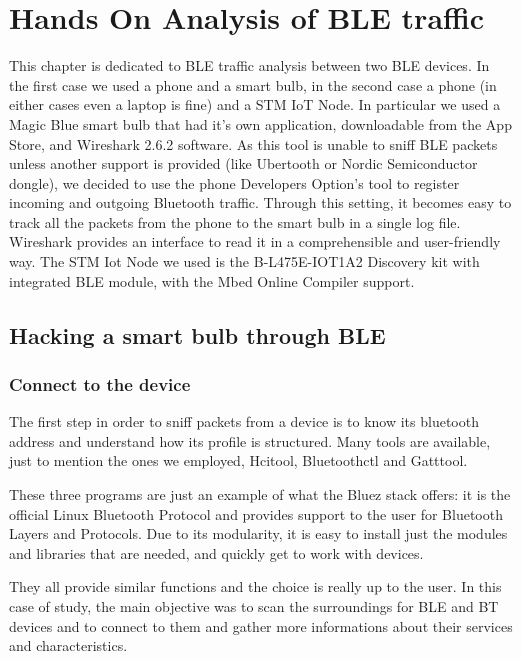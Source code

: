 \chapter{Hands On Analysis of BLE traffic}
\label{chapter3}
\thispagestyle{empty}

\noindent 
This chapter is dedicated to BLE traffic analysis between two BLE devices.
In the first case we used a phone and a smart bulb, in the second case a phone (in either cases even a laptop is fine) and a STM IoT Node.
In particular we used a Magic Blue smart bulb that had it's own application, downloadable from the App Store, and Wireshark 2.6.2 software. As this tool is unable to sniff BLE packets unless another support is provided (like Ubertooth or Nordic Semiconductor dongle), we decided to use the phone Developers Option's tool to register incoming and outgoing Bluetooth traffic.
Through this setting, it becomes easy to track all the packets from the phone to the smart bulb in a single log file. Wireshark provides an interface to read it in a comprehensible and user-friendly way.
The STM Iot Node we used is the B-L475E-IOT1A2 Discovery kit with integrated BLE module, with the Mbed Online Compiler support.

\section{Hacking a smart bulb through BLE}
\subsection{Connect to the device}

The first step in order to sniff packets from a device is to know its bluetooth address and understand how its profile is structured.
Many tools are available, just to mention the ones we employed, Hcitool, Bluetoothctl and Gatttool.

These three programs are just an example of what the Bluez stack offers: it is the official Linux Bluetooth Protocol and provides support to the user for Bluetooth Layers and Protocols.
Due to its modularity, it is easy to install just the modules and libraries that are needed, and quickly get to work with devices.

They all provide similar functions and the choice is really up to the user. In this case of study, the main objective was to scan the surroundings for BLE and BT devices and to connect to them and gather more informations about their services and characteristics.

